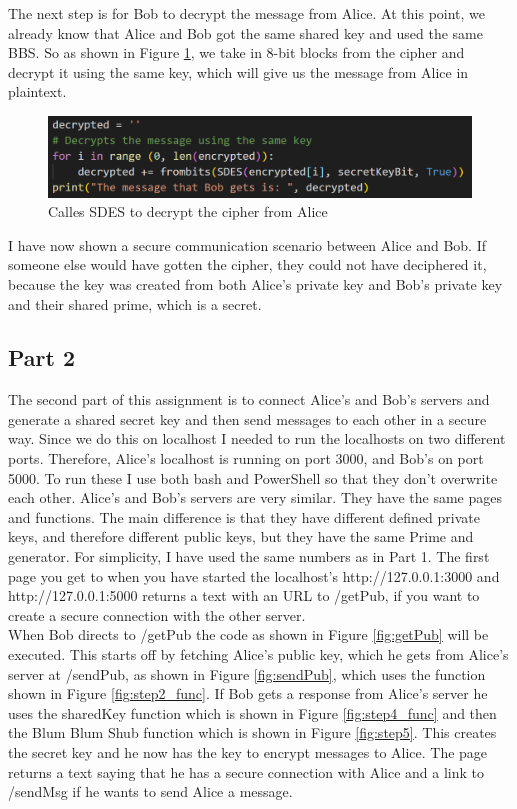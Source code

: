 \documentclass[12pt, letterpaper]{article}
\begin{document}
The next step is for Bob to decrypt the message from Alice. At this point, we already know that Alice and Bob got the same shared key and used the same BBS. So as shown in Figure \ref{fig:step7}, we take in 8-bit blocks from the cipher and decrypt it using the same key, which will give us the message from Alice in plaintext.

\begin{figure}[H]
  \includegraphics[width=\linewidth]{code_snippets/step7.PNG}
  \caption{Calles SDES to decrypt the cipher from Alice}
  \label{fig:step7}
\end{figure}

I have now shown a secure communication scenario between Alice and Bob. If someone else would have gotten the cipher, they could not have deciphered it, because the key was created from both Alice's private key and Bob's private key and their shared prime, which is a secret. 

\subsection*{Part 2}
The second part of this assignment is to connect Alice's and Bob's servers and generate a shared secret key and then send messages to each other in a secure way. Since we do this on localhost I needed to run the localhosts on two different ports. Therefore, Alice's localhost is running on port 3000, and Bob's on port 5000. To run these I use both bash and PowerShell so that they don't overwrite each other. Alice's and Bob's servers are very similar. They have the same pages and functions. The main difference is that they have different defined private keys, and therefore different public keys, but they have the same Prime and generator. For simplicity, I have used the same numbers as in Part 1. The first page you get to when you have started the localhost's http://127.0.0.1:3000 and http://127.0.0.1:5000 returns a text with an URL to /getPub, if you want to create a secure connection with the other server. 
\\
When Bob directs to /getPub the code as shown in Figure \ref{fig:getPub} will be executed. This starts off by fetching Alice's public key, which he gets from Alice's server at /sendPub, as shown in Figure \ref{fig:sendPub}, which uses the function shown in Figure \ref{fig:step2_func}. If Bob gets a response from Alice's server he uses the sharedKey function which is shown in Figure \ref{fig:step4_func} and then the Blum Blum Shub function which is shown in Figure \ref{fig:step5}. This creates the secret key and he now has the key to encrypt messages to Alice. The page returns a text saying that he has a secure connection with Alice and a link to /sendMsg if he wants to send Alice a message.
\end{document}
